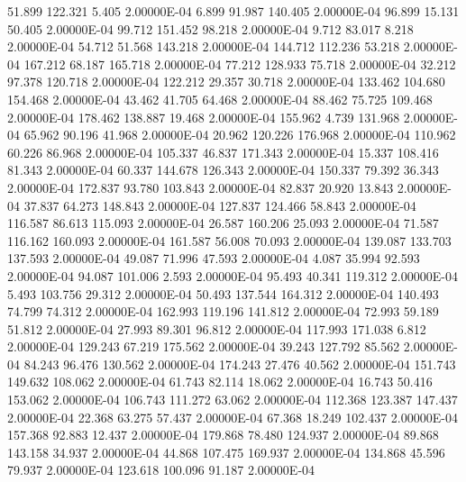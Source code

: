     51.899   122.321     5.405  2.00000E-04
     6.899    91.987   140.405  2.00000E-04
    96.899    15.131    50.405  2.00000E-04
    99.712   151.452    98.218  2.00000E-04
     9.712    83.017     8.218  2.00000E-04
    54.712    51.568   143.218  2.00000E-04
   144.712   112.236    53.218  2.00000E-04
   167.212    68.187   165.718  2.00000E-04
    77.212   128.933    75.718  2.00000E-04
    32.212    97.378   120.718  2.00000E-04
   122.212    29.357    30.718  2.00000E-04
   133.462   104.680   154.468  2.00000E-04
    43.462    41.705    64.468  2.00000E-04
    88.462    75.725   109.468  2.00000E-04
   178.462   138.887    19.468  2.00000E-04
   155.962     4.739   131.968  2.00000E-04
    65.962    90.196    41.968  2.00000E-04
    20.962   120.226   176.968  2.00000E-04
   110.962    60.226    86.968  2.00000E-04
   105.337    46.837   171.343  2.00000E-04
    15.337   108.416    81.343  2.00000E-04
    60.337   144.678   126.343  2.00000E-04
   150.337    79.392    36.343  2.00000E-04
   172.837    93.780   103.843  2.00000E-04
    82.837    20.920    13.843  2.00000E-04
    37.837    64.273   148.843  2.00000E-04
   127.837   124.466    58.843  2.00000E-04
   116.587    86.613   115.093  2.00000E-04
    26.587   160.206    25.093  2.00000E-04
    71.587   116.162   160.093  2.00000E-04
   161.587    56.008    70.093  2.00000E-04
   139.087   133.703   137.593  2.00000E-04
    49.087    71.996    47.593  2.00000E-04
     4.087    35.994    92.593  2.00000E-04
    94.087   101.006     2.593  2.00000E-04
    95.493    40.341   119.312  2.00000E-04
     5.493   103.756    29.312  2.00000E-04
    50.493   137.544   164.312  2.00000E-04
   140.493    74.799    74.312  2.00000E-04
   162.993   119.196   141.812  2.00000E-04
    72.993    59.189    51.812  2.00000E-04
    27.993    89.301    96.812  2.00000E-04
   117.993   171.038     6.812  2.00000E-04
   129.243    67.219   175.562  2.00000E-04
    39.243   127.792    85.562  2.00000E-04
    84.243    96.476   130.562  2.00000E-04
   174.243    27.476    40.562  2.00000E-04
   151.743   149.632   108.062  2.00000E-04
    61.743    82.114    18.062  2.00000E-04
    16.743    50.416   153.062  2.00000E-04
   106.743   111.272    63.062  2.00000E-04
   112.368   123.387   147.437  2.00000E-04
    22.368    63.275    57.437  2.00000E-04
    67.368    18.249   102.437  2.00000E-04
   157.368    92.883    12.437  2.00000E-04
   179.868    78.480   124.937  2.00000E-04
    89.868   143.158    34.937  2.00000E-04
    44.868   107.475   169.937  2.00000E-04
   134.868    45.596    79.937  2.00000E-04
   123.618   100.096    91.187  2.00000E-04
